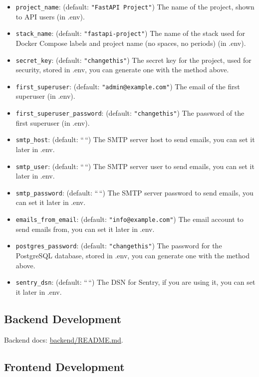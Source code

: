 \documentclass[
]{article}
\providecommand{\tightlist}{%
  \setlength{\itemsep}{0pt}\setlength{\parskip}{0pt}}
\begin{document}
\begin{itemize}
\tightlist
\item
  \texttt{project\_name}: (default: \texttt{"FastAPI\ Project"}) The
  name of the project, shown to API users (in .env).
\item
  \texttt{stack\_name}: (default: \texttt{"fastapi-project"}) The name
  of the stack used for Docker Compose labels and project name (no
  spaces, no periods) (in .env).
\item
  \texttt{secret\_key}: (default: \texttt{"changethis"}) The secret key
  for the project, used for security, stored in .env, you can generate
  one with the method above.
\item
  \texttt{first\_superuser}: (default: \texttt{"admin@example.com"}) The
  email of the first superuser (in .env).
\item
  \texttt{first\_superuser\_password}: (default: \texttt{"changethis"})
  The password of the first superuser (in .env).
\item
  \texttt{smtp\_host}: (default: ``\,``) The SMTP server host to send
  emails, you can set it later in .env.
\item
  \texttt{smtp\_user}: (default: ``\,``) The SMTP server user to send
  emails, you can set it later in .env.
\item
  \texttt{smtp\_password}: (default: ``\,``) The SMTP server password to
  send emails, you can set it later in .env.
\item
  \texttt{emails\_from\_email}: (default: \texttt{"info@example.com"})
  The email account to send emails from, you can set it later in .env.
\item
  \texttt{postgres\_password}: (default: \texttt{"changethis"}) The
  password for the PostgreSQL database, stored in .env, you can generate
  one with the method above.
\item
  \texttt{sentry\_dsn}: (default: ``\,``) The DSN for Sentry, if you are
  using it, you can set it later in .env.
\end{itemize}

\hypertarget{backend-development}{%
\subsection{Backend Development}\label{backend-development}}

Backend docs: \href{./backend/README.md}{backend/README.md}.

\hypertarget{frontend-development}{%
\subsection{Frontend Development}\label{frontend-development}}
\end{document}
